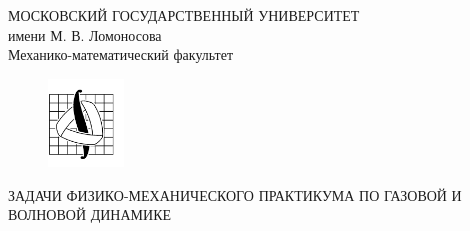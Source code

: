 \documentclass[specialist, subf, href, colorlinks=true, 14pt, final]{disser}
\theoremstyle{definition}
\begin{document}
\begin{titlepage}
\begin{center}
МОСКОВСКИЙ ГОСУДАРСТВЕННЫЙ УНИВЕРСИТЕТ\\
имени М. В. Ломоносова\\
Механико-математический факультет\\
\vspace{1cm}
\begin{figure}[!htp]%
  \begin{center}%
        {\includegraphics[width=20mm]{pics/mmlogo.png}}%
  \end{center}
\end{figure}
\vspace{4cm}
\Large{
ЗАДАЧИ ФИЗИКО-МЕХАНИЧЕСКОГО ПРАКТИКУМА ПО ГАЗОВОЙ И ВОЛНОВОЙ ДИНАМИКЕ
}\\
\vspace{4cm}
\end{center}
\end{titlepage}

\tableofcontents
\end{document}
